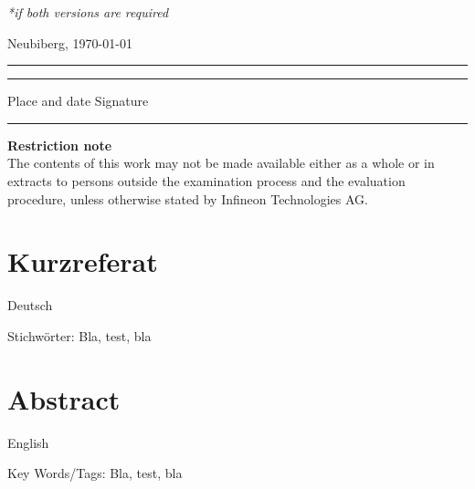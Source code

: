 {		\footnotesize{\textit{*if both versions are required}}\\[48pt]
		\normalsize
		
		\vspace{-5pt}
		\begin{flushleft}
			Neubiberg, \today \vspace{-2.05cm}
		\end{flushleft}
		\begin{flushright}
		\end{flushright}
		
		\noindent\rule{5.1cm}{.5pt}\hfill\rule{5.1cm}{.5pt}\par 
		\noindent Place and date \hfill Signature \\[80pt]
		
		\hrule 
		\vspace*{1.0cm}	
		\noindent \textbf{\Large{Restriction note}}\\
		\normalsize
		The contents of this work may not be made available either as a whole or in extracts to persons outside the examination process and the evaluation procedure, unless otherwise stated by Infineon Technologies AG.
	}
	
\clearpage
	
	
\section*{Kurzreferat}
	
	Deutsch
	
	\vspace{2ex}
	
	\noindent
	Stichwörter: Bla, test, bla
	
\section*{Abstract}
	English
	
	\vspace{2ex}
	
	
	\noindent
	Key Words/Tags: Bla, test, bla
	
	
